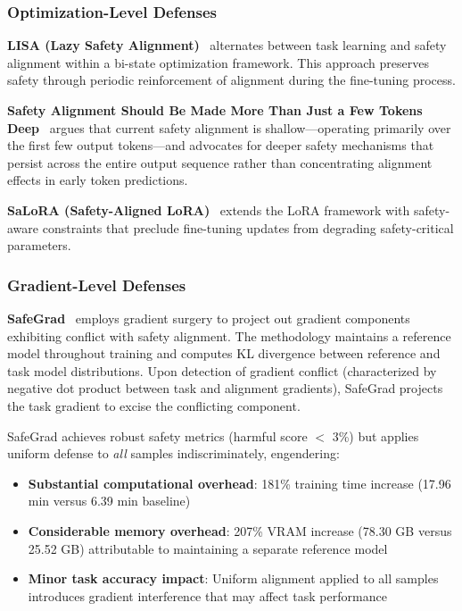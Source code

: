 \subsubsection{Optimization-Level Defenses}

\textbf{LISA (Lazy Safety Alignment)}~\cite{huang2024lazy} alternates between task learning and safety alignment within a bi-state optimization framework. This approach preserves safety through periodic reinforcement of alignment during the fine-tuning process.

\textbf{Safety Alignment Should Be Made More Than Just a Few Tokens Deep}~\cite{qi2024safety} argues that current safety alignment is shallow---operating primarily over the first few output tokens---and advocates for deeper safety mechanisms that persist across the entire output sequence rather than concentrating alignment effects in early token predictions.

\textbf{SaLoRA (Safety-Aligned LoRA)}~\cite{wu2024salora} extends the LoRA framework with safety-aware constraints that preclude fine-tuning updates from degrading safety-critical parameters.

\subsubsection{Gradient-Level Defenses}

\textbf{SafeGrad}~\cite{yi2025safegrad} employs gradient surgery to project out gradient components exhibiting conflict with safety alignment. The methodology maintains a reference model throughout training and computes KL divergence between reference and task model distributions. Upon detection of gradient conflict (characterized by negative dot product between task and alignment gradients), SafeGrad projects the task gradient to excise the conflicting component.

SafeGrad achieves robust safety metrics (harmful score $<$ 3\%) but applies uniform defense to \textit{all} samples indiscriminately, engendering:
\begin{itemize}
    \item \textbf{Substantial computational overhead}: 181\% training time increase (17.96 min versus 6.39 min baseline)
    \item \textbf{Considerable memory overhead}: 207\% VRAM increase (78.30 GB versus 25.52 GB) attributable to maintaining a separate reference model
    \item \textbf{Minor task accuracy impact}: Uniform alignment applied to all samples introduces gradient interference that may affect task performance
\end{itemize}

